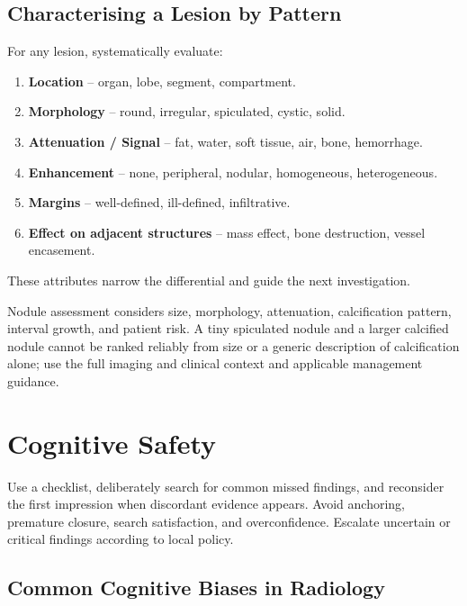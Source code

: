 \subsection{Characterising a Lesion by Pattern}
For any lesion, systematically evaluate:
\begin{enumerate}
    \item \textbf{Location} -- organ, lobe, segment, compartment.
    \item \textbf{Morphology} -- round, irregular, spiculated, cystic, solid.
    \item \textbf{Attenuation / Signal} -- fat, water, soft tissue, air, bone, hemorrhage.
    \item \textbf{Enhancement} -- none, peripheral, nodular, homogeneous, heterogeneous.
    \item \textbf{Margins} -- well-defined, ill-defined, infiltrative.
    \item \textbf{Effect on adjacent structures} -- mass effect, bone destruction, vessel encasement.
\end{enumerate}
These attributes narrow the differential and guide the next investigation.

\begin{pearlbox}
Nodule assessment considers size, morphology, attenuation, calcification pattern, interval growth, and patient risk. A tiny spiculated nodule and a larger calcified nodule cannot be ranked reliably from size or a generic description of calcification alone; use the full imaging and clinical context and applicable management guidance.
\end{pearlbox}

\section{Cognitive Safety}
Use a checklist, deliberately search for common missed findings, and reconsider the first impression when discordant evidence appears. Avoid anchoring, premature closure, search satisfaction, and overconfidence. Escalate uncertain or critical findings according to local policy.

\subsection{Common Cognitive Biases in Radiology}

